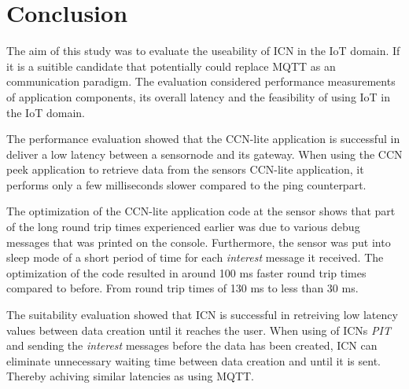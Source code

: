 \section{Conclusion}

%
%

The aim of this study was to evaluate the useability of ICN in the IoT domain. If it is a suitible candidate that potentially could replace MQTT as an communication paradigm.
The evaluation considered performance measurements of application components, its overall latency and the feasibility of using IoT in the IoT domain.

The performance evaluation showed that the CCN-lite application is successful in deliver a low latency between a sensornode and its gateway. 
When using the CCN peek application to retrieve data from the sensors CCN-lite application, it performs only a few milliseconds slower compared to the ping counterpart.

The optimization of the CCN-lite application code at the sensor shows that part of the long round trip times experienced earlier was due to various debug messages that was printed on the console. Furthermore, the sensor was put into sleep mode of a short period of time for each \textit{interest} message it received. The optimization of the code resulted in around 100 ms faster round trip times compared to before. From round trip times of 130 ms to less than 30 ms.

The suitability evaluation showed that ICN is successful in retreiving low latency values between data creation until it reaches the user. When using of ICNs \textit{PIT} and sending the \textit{interest} messages before the data has been created, ICN can eliminate unnecessary waiting time between data creation and until it is sent. Thereby achiving similar latencies as using MQTT.

